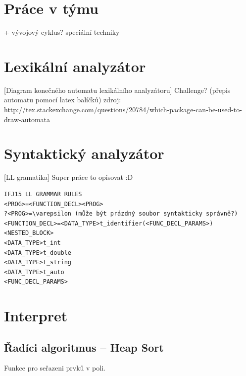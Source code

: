 \documentclass[a4paper, 12pt]{article}
\begin{document}
\tableofcontents
\newpage
\section{Práce v týmu}
+ vývojový cyklus? speciální techniky
\section{Lexikální analyzátor} \label{lexer}
[Diagram konečného automatu lexikálního analyzátoru]
Challenge? (přepis automatu pomocí latex balíčků)
zdroj: http://tex.stackexchange.com/questions/20784/which-package-can-be-used-to-draw-automata

\section{Syntaktický analyzátor} \label{parser}
[LL gramatika]
Super práce to opisovat :D
\begin{verbatim}
IFJ15 LL GRAMMAR RULES
<PROG>=<FUNCTION_DECL><PROG>
?<PROG>=\varepsilon (může být prázdný soubor syntakticky správně?)
<FUNCTION_DECL>=<DATA_TYPE>t_identifier(<FUNC_DECL_PARAMS>)<NESTED_BLOCK>
<DATA_TYPE>t_int
<DATA_TYPE>t_double
<DATA_TYPE>t_string
<DATA_TYPE>t_auto
<FUNC_DECL_PARAMS>
\end{verbatim}
\section{Interpret} \label{interpret}

\subsection{Řadíci algoritmus -- Heap Sort}
Funkce pro seřazeni prvků v poli.
\end{document}
